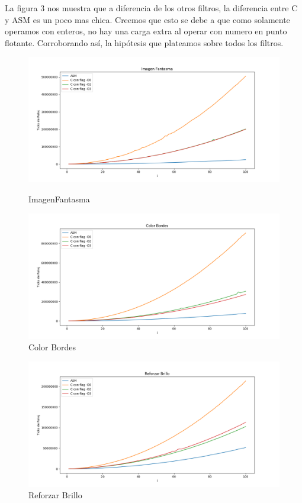 \documentclass[a4paper]{article}
\begin{document}
La figura 3 nos muestra que a diferencia de los otros filtros, la diferencia entre C y ASM es un poco mas chica. Creemos que esto se debe a que como solamente operamos con enteros, no hay una carga extra al operar con numero en punto flotante. Corroborando así, la hipótesis que plateamos sobre todos los filtros.


\begin{figure}[h!]			
			\includegraphics[width=\linewidth]{img/imagenFantasma.png}
			\caption{ImagenFantasma}
			\includegraphics[width=\linewidth]{img/colorBordes.png}
			\caption{Color Bordes}
\end{figure}


\begin{figure}[h!]			
	\includegraphics[width=\linewidth]{img/reforzarBrillo.png}
	\caption{Reforzar Brillo}
\end{figure}
\end{document}

